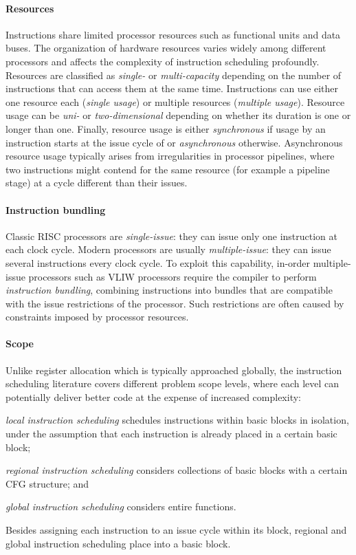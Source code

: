 \documentclass[acmsmall,authorversion,nonacm]{acmart}
\begin{document}
\paragraph{Resources}

Instructions share limited processor resources such as functional
units and data buses.
The organization of hardware resources varies widely among different
processors and affects the complexity of instruction scheduling
profoundly.
Resources are classified as \emph{single-} or \emph{multi-capacity}
depending on the number of instructions that can access them at the same
time.
Instructions can use either one resource each (\emph{single usage}) or
multiple resources (\emph{multiple usage}).
Resource usage can be \emph{uni-} or \emph{two-dimensional} depending on
whether its duration is one or longer than one.
Finally, resource usage is either \emph{synchronous} if usage by an
instruction  starts at the issue cycle of  or \emph{asynchronous}
otherwise.
Asynchronous resource usage typically arises from irregularities in
processor pipelines, where two instructions might contend for the same
resource (for example a pipeline stage) at a cycle different than
their issues.

\paragraph{Instruction bundling}

Classic RISC processors are \emph{single-issue}: they can issue only
one instruction at each clock cycle.
Modern processors are usually \emph{multiple-issue}: they can issue
several instructions every clock cycle.
To exploit this capability, in-order multiple-issue processors such as
VLIW processors require the compiler to perform \emph{instruction
  bundling}, combining instructions into bundles that are compatible
with the issue restrictions of the processor.
Such restrictions are often caused by constraints imposed by processor
resources.

\paragraph{Scope}

Unlike register allocation which is typically approached globally, the
instruction scheduling literature covers different problem scope
levels, where each level can potentially deliver better code at the
expense of increased complexity:
\begin{inparaitem}[]
\item \emph{local instruction scheduling} schedules instructions
  within basic blocks in isolation, under the assumption that each
  instruction is already placed in a certain basic block;
\item \emph{regional instruction scheduling} considers collections of
  basic blocks with a certain CFG structure; and
\item \emph{global instruction scheduling} considers entire functions.
\end{inparaitem}
Besides assigning each instruction  to an issue cycle within its
block, regional and global instruction scheduling place  into a
basic block.
\end{document}
